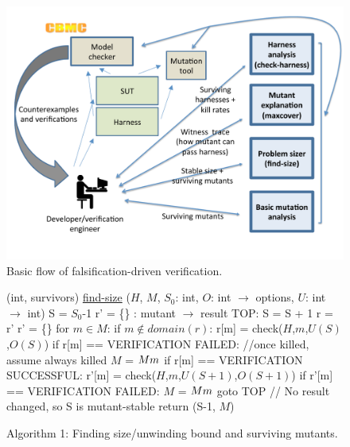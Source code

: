 \documentclass{svjour3}
\begin{document}
\begin{figure}
\includegraphics[width=\columnwidth]{TestFlow}
\caption{Basic flow of falsification-driven verification.}
\label{fig:flow}
\end{figure}

\begin{figure}
{%
\begin{code}
(int, survivors) {\underline{find-size}} ($H$, $M$, $S_0$: int,
                            $O$: int $\rightarrow$ options,
                            $U$: int $\rightarrow$ int) 
\vspace{0.1in}
  S = $S_0$-1 
  r' = \{\} : mutant $\rightarrow$ result
  TOP:
  S = S + 1 
  r = r' 
  r' = \{\}
  for $m \in M$:
     if $m \not\in domain(r)$:
         r[m] = check($H$,$m$,$U(S)$,$O(S)$) 
         if r[m] == VERIFICATION FAILED:
           //once killed, assume always killed 
           $M$ = $M \\ m$
     if r[m] == VERIFICATION SUCCESSFUL:
        r'[m] = check($H$,$m$,$U(S+1)$,$O(S+1)$) 
        if r'[m] == VERIFICATION FAILED:
           $M$ = $M \\ m$
           goto TOP 
  // No result changed, so S is mutant-stable 
  return (S-1, $M$) 
\end{code}
}
\caption{Algorithm 1: Finding size/unwinding bound and surviving
  mutants.}
\label{alg:unwind}
\end{figure}
\end{document}
